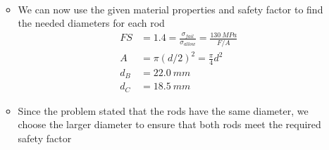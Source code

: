 \documentclass[12pt, oneside]{article}
\begin{document}
\begin{enumerate}
\begin{itemize}
\begin{align*}
			\end{align*}
		\item We can now use the given material properties and safety factor to find the needed diameters for each rod
			\begin{align*}
				FS &= 1.4 = \frac{\sigma_{fail}}{\sigma_{allow}} = \frac{\SI{130}{MPa}}{F/A}\\
				A &= \pi (d/2)^2 = \frac{\pi}{4}d^2\\
				d_B &= \SI{22.0}{mm}\\
				d_C &= \SI{18.5}{mm}
			\end{align*}
		\item Since the problem stated that the rods have the same diameter, we choose the larger diameter to ensure that both rods meet the required safety factor
		\end{itemize}


\end{enumerate}
\end{document}
